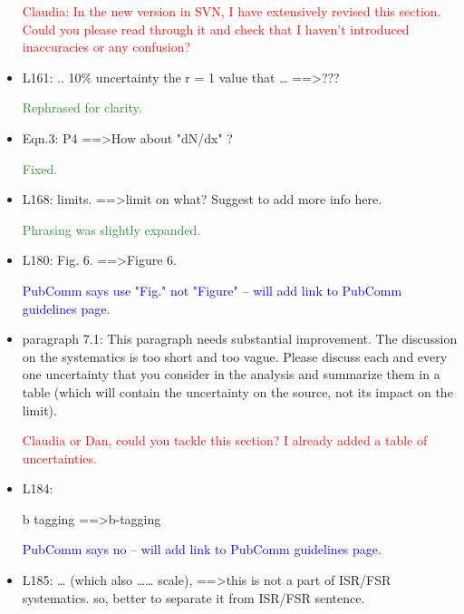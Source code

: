 \documentclass[paper=a4, fontsize=11pt]{scrartcl}
\begin{document}
\begin{itemize}
\textcolor{Red}{Claudia: In the new version in SVN, I have extensively revised this section.
Could you please read through it and check that I haven't introduced
inaccuracies or any confusion?}\\



\item L161: 
.. 10\% uncertainty the r = 1 value that … ==\textgreater ??? 

\textcolor{ForestGreen}{Rephrased for clarity.}\\

\item Eqn.3: 
P4 ==\textgreater How about "dN/dx" ? 

\textcolor{ForestGreen}{Fixed.}\\


\item L168: 
limits. ==\textgreater limit on what? Suggest to add more info here. 

\textcolor{ForestGreen}{Phrasing was slightly expanded.}\\

\item L180: 
Fig. 6. ==\textgreater Figure 6. 

\textcolor{Blue}{PubComm says use "Fig." not "Figure" -- will add link to PubComm guidelines page.}\\

\item paragraph 7.1: 
This paragraph needs substantial improvement. The discussion on the 
systematics is too short and too vague. Please discuss each and every one 
uncertainty that you consider in the analysis and summarize them in a table 
(which will contain the uncertainty on the source, not its impact on the 
limit). 

\textcolor{Red}{Claudia or Dan, could you tackle this section? I already added a table of uncertainties.}\\



\item L184: 

b tagging ==\textgreater b-tagging 

\textcolor{Blue}{PubComm says no -- will add link to PubComm guidelines page.}\\

\item L185: … (which also …… scale), ==\textgreater this is not a part of ISR/FSR 
systematics. so, better to separate it from ISR/FSR sentence. 


\end{itemize}
\end{document}
